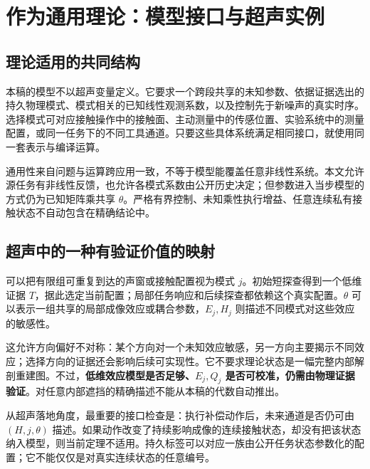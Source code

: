 \documentclass[UTF8,fontset=fandol,11pt,a4paper]{ctexart}
\theoremstyle{definition}
\theoremstyle{remark}
\numberwithin{equation}{section}
\begin{document}
\section{作为通用理论：模型接口与超声实例}
\label{sec:application}

\subsection{理论适用的共同结构}
本稿的模型不以超声变量定义。它要求一个跨段共享的未知参数、依据证据选出的持久物理模式、模式相关的已知线性观测系数，以及控制先于新噪声的真实时序。选择模式可对应接触操作中的接触面、主动测量中的传感位置、实验系统中的测量配置，或同一任务下的不同工具通道。只要这些具体系统满足相同接口，就使用同一套表示与编译运算。

通用性来自问题与运算跨应用一致，不等于模型能覆盖任意非线性系统。本文允许源任务有非线性反馈，也允许各模式系数由公开历史决定；但参数进入当步模型的方式仍为已知矩阵乘共享 $\theta$。严格有界控制、未知乘性执行增益、任意连续私有接触状态不自动包含在精确结论中。

\subsection{超声中的一种有验证价值的映射}
可以把有限组可重复到达的声窗或接触配置视为模式 $j$。初始短探查得到一个低维证据 $T$，据此选定当前配置；局部任务响应和后续探查都依赖这个真实配置。$\theta$ 可以表示一组共享的局部成像效应或耦合参数，$E_j,H_j$ 则描述不同模式对这些效应的敏感性。

这允许方向偏好不对称：某个方向对一个未知效应敏感，另一方向主要揭示不同效应；选择方向的证据还会影响后续可实现性。它不要求理论状态是一幅完整内部解剖重建图。不过，\textbf{低维效应模型是否足够、$E_j,Q_j$ 是否可校准，仍需由物理证据验证}。对任意内部遮挡的精确描述不能从本稿的代数自动推出。

从超声落地角度，最重要的接口检查是：执行补偿动作后，未来通道是否仍可由 $(H,j,\theta)$ 描述。如果动作改变了持续影响成像的连续接触状态，却没有把该状态纳入模型，则当前定理不适用。持久标签可以对应一族由公开任务状态参数化的配置；它不能仅仅是对真实连续状态的任意编号。
\end{document}

